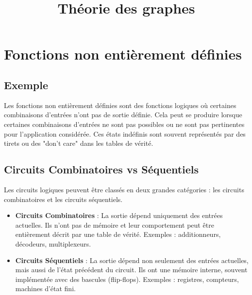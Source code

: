 \documentclass[10pt,a4paper]{article}
\title{Théorie des graphes}
\date{}
\begin{document}
\section*{Fonctions non entièrement définies}

\subsection*{Exemple}

Les fonctions non entièrement définies sont des fonctions logiques où certaines combinaisons d'entrées n'ont pas de sortie définie. Cela peut se produire lorsque certaines combinaisons d'entrées ne sont pas possibles ou ne sont pas pertinentes pour l'application considérée. Ces états indéfinis sont souvent représentés par des tirets ou des "don't care" dans les tables de vérité.





\subsection*{Circuits Combinatoires vs Séquentiels}

Les circuits logiques peuvent être classés en deux grandes catégories : les circuits combinatoires et les circuits séquentiels.

\begin{itemize}
    \item \textbf{Circuits Combinatoires} : La sortie dépend uniquement des entrées actuelles. Ils n'ont pas de mémoire et leur comportement peut être entièrement décrit par une table de vérité. Exemples : additionneurs, décodeurs, multiplexeurs.


    \item \textbf{Circuits Séquentiels} : La sortie dépend non seulement des entrées actuelles, mais aussi de l'état précédent du circuit. Ils ont une mémoire interne, souvent implémentée avec des bascules (flip-flops). Exemples : registres, compteurs, machines d'état fini.

\end{itemize}
\end{document}
